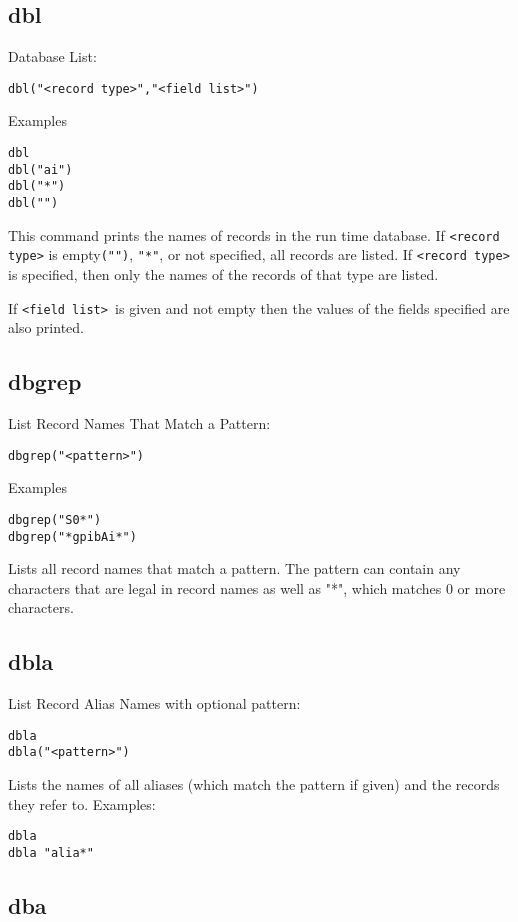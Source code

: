 \subsection{dbl}

Database List:

\begin{verbatim}dbl("<record type>","<field list>")
\end{verbatim}Examples

\begin{verbatim}dbl
dbl("ai")
dbl("*")
dbl("")

\end{verbatim}This command prints the names of records in the run time database. If \verb|<record type>| is empty\verb|("")|, \verb|"*"|, or not 
specified, all records are listed. If \verb|<record type>| is specified, then only the names of the records of that type are 
listed.

If  \verb|<field list> |is given and not empty then the values of the fields specified are also printed.

\subsection{dbgrep}

List Record Names That Match a Pattern:

\begin{verbatim}dbgrep("<pattern>")
\end{verbatim}Examples

\begin{verbatim}dbgrep("S0*")
dbgrep("*gpibAi*")
\end{verbatim}Lists all record names that match a pattern. The pattern can contain any characters that are legal in record names as well as 
"*", which matches 0 or more characters.

\subsection{dbla}

List Record Alias Names with optional pattern:

\begin{verbatim}dbla
dbla("<pattern>")
\end{verbatim}Lists the names of all aliases (which match the pattern if given) and the records they refer to. Examples:

\begin{verbatim}dbla
dbla "alia*"
\end{verbatim}\subsection{dba}

